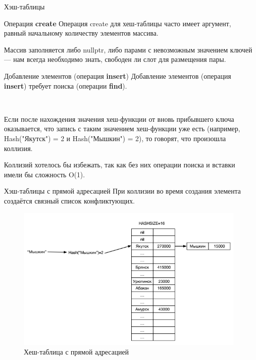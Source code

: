 \documentclass{beamer}
\begin{document}
\begin{frame}{Хэш-таблицы}
    \begin{block}{Операция \textbf{create}}
        Операция create для хеш-таблицы часто имеет аргумент, равный начальному количеству элементов массива. 
        
        Массив заполняется либо nullptr, либо парами с невозможным значением ключей — нам всегда необходимо знать, свободен ли слот для размещения пары.
    \end{block}
    \begin{block}{Добавление элементов (операция \textbf{insert})}
        Добавление элементов (операция \textbf{insert}) требует поиска (операции \textbf{find}).        
        
        ~
        
        Если после нахождения значения хеш-функции от вновь прибывшего ключа оказывается, что запись с таким значением хеш-функции уже есть (например, Hash("Якутск") = 2 и Hash("Мышкин") = 2), то говорят, что произошла коллизия. 
    \end{block}    
    Коллизий хотелось бы избежать, так как без них операции поиска и вставки имели бы сложность O(1).
\end{frame} 

\begin{frame}{Хэш-таблицы с прямой адресацией}
    При коллизии во время создания элемента создаётся связный список
конфликтующих. 
	\begin{figure}[h]
		\centering
		\includegraphics[scale=0.6]{images/lec08-pic14.png}
		\caption{Хеш-таблица с прямой адресацией}
	\end{figure}
\end{frame}
\end{document}
